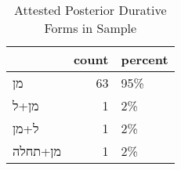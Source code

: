 \begin{table}[htbp!]
\centering
\caption{Attested Posterior Durative Forms in Sample}
\label{table:postdur_front}
\begin{tabular}{lrl}
\toprule
{} &  count & percent \\
\midrule
\texthebrew{מן}      &     63 &     95\% \\
\texthebrew{מן+ל}    &      1 &      2\% \\
\texthebrew{ל+מן}    &      1 &      2\% \\
\texthebrew{מן+תחלה} &      1 &      2\% \\
\bottomrule
\end{tabular}
\end{table}
